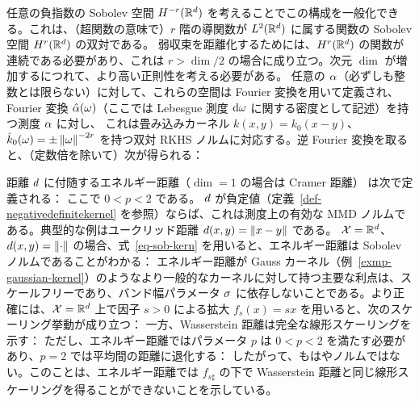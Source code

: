 \begin{example}\label{exp-sobolev-neg}
	任意の負指数の Sobolev 空間 $H^{-r}(\mathbb{R}^d)$ を考えることでこの構成を一般化できる。これは、（超関数の意味で）$r$ 階の導関数が $L^2(\mathbb{R}^d)$ に属する関数の Sobolev 空間 $H^{r}(\mathbb{R}^d)$ の双対である。
	弱収束を距離化するためには、$H^{r}(\mathbb{R}^d)$ の関数が連続である必要があり、これは $r>\dim/2$ の場合に成り立つ。次元 $\dim$ が増加するにつれて、より高い正則性を考える必要がある。
	任意の $\alpha$（必ずしも整数とは限らない）に対して、これらの空間は Fourier 変換を用いて定義され、Fourier 変換 $\hat {\alpha}(\omega)$（ここでは Lebesgue 測度 $\mathrm{d}\omega$ に関する密度として記述）を持つ測度 $\alpha$ に対し、
	これは畳み込みカーネル $k(x,y)=k_0(x-y)$、$\hat k_0(\omega) = \pm \left\| \omega \right\|^{-2r}$ を持つ双対 RKHS ノルムに対応する。逆 Fourier 変換を取ると、（定数倍を除いて）次が得られる：
\end{example}




\begin{example}[エネルギー距離]\label{exp-energy-dist}
距離 $d$ に付随するエネルギー距離（$\dim=1$ の場合は Cramer 距離）\citep{szekely2004testing} は次で定義される：
ここで $0 < p < 2$ である。
%
$d$ が負定値（定義~\ref{def-negativedefinitekernel} を参照）ならば、これは測度上の有効な MMD ノルムである。典型的な例はユークリッド距離 $d(x,y)=\left\| x-y \right\|$ である。
%
$\mathcal{X}=\mathbb{R}^d$、$d(x,y)=\left\| \cdot \right\|$ の場合、式~\eqref{eq-sob-kern} を用いると、エネルギー距離は Sobolev ノルムであることがわかる：
エネルギー距離が Gauss カーネル（例~\ref{exmp-gaussian-kernel}）のようなより一般的なカーネルに対して持つ主要な利点は、スケールフリーであり、バンド幅パラメータ $\sigma$ に依存しないことである。より正確には、$\mathcal{X}=\mathbb{R}^d$ 上で因子 $s>0$ による拡大 $f_s(x)=sx$ を用いると、次のスケーリング挙動が成り立つ：
一方、Wasserstein 距離は完全な線形スケーリングを示す：
ただし、エネルギー距離ではパラメータ $p$ は $0 < p < 2$ を満たす必要があり、$p=2$ では平均間の距離に退化する：
したがって、もはやノルムではない。このことは、エネルギー距離では $f_{s\sharp}$ の下で Wasserstein 距離と同じ線形スケーリングを得ることができないことを示している。
\end{example}





